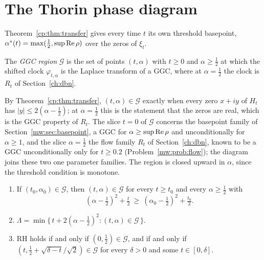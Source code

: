 \section{The Thorin phase diagram}\label{cp:sec:phase}

Theorem~\ref{cp:thm:transfer} gives every time $t$ its own threshold basepoint, $\alpha^*(t)=\max(\frac12,\sup\operatorname{Re}\rho)$ over the zeros of $\xi_t$.

\begin{definition}\label{cp:def:G}
The \emph{GGC region} $\mathcal G$ is the set of points $(t,\alpha)$ with $t\ge0$ and $\alpha\ge\frac12$ at which the shifted clock $\varphi_{t,\alpha}$ is the Laplace transform of a GGC, where at $\alpha=\frac12$ the clock is $R_t$ of Section~\ref{ch:dbn}.
\end{definition}

By Theorem~\ref{cp:thm:transfer}, $(t,\alpha)\in\mathcal G$ exactly when every zero $x+iy$ of $H_t$ has $|y|\le2(\alpha-\frac12)$; at $\alpha=\frac12$ this is the statement that the zeros are real, which is the GGC property of $R_t$. The slice $t=0$ of $\mathcal G$ concerns the basepoint family of Section~\ref{mw:sec:basepoint}, a GGC for $\alpha\ge\sup\operatorname{Re}\rho$ and unconditionally for $\alpha\ge1$, and the slice $\alpha=\frac12$ the flow family $R_t$ of Section~\ref{ch:dbn}, known to be a GGC unconditionally only for $t\ge0.2$ (Problem~\ref{mw:prob:flow}); the diagram joins these two one parameter families. The region is closed upward in $\alpha$, since the threshold condition is monotone.

\begin{theorem}\label{cp:thm:phase}
\begin{enumerate}
\item[(i)] If $(t_0,\alpha_0)\in\mathcal G$, then $(t,\alpha)\in\mathcal G$ for every $t\ge t_0$ and every $\alpha\ge\frac12$ with
\[
(\alpha-\tfrac12)^2+\tfrac t2\ \ge\ (\alpha_0-\tfrac12)^2+\tfrac{t_0}2 .
\]
\item[(ii)] $\Lambda=\min\{\,t+2(\alpha-\frac12)^2:(t,\alpha)\in\mathcal G\,\}$.
\item[(iii)] RH holds if and only if $(0,\frac12)\in\mathcal G$, and if and only if $(t,\frac12+\sqrt{\delta-t}/\sqrt2)\in\mathcal G$ for every $\delta>0$ and some $t\in[0,\delta]$.
\end{enumerate}
\end{theorem}

